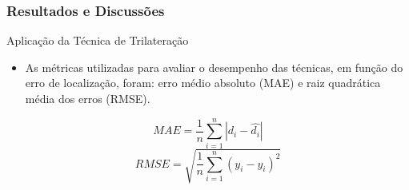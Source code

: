 \documentclass[xcolor={dvipsnames,svgnames,table}]{beamer}
\begin{document}
	\begin{frame}
		\frametitle{Resultados e Discussões}
		\begin{block}{Aplicação da Técnica de Trilateração}
			\begin{itemize}[label=\textcolor{black}{\textbullet}, left=5pt]
				\justifying
				\item As métricas utilizadas para avaliar o desempenho das técnicas, em função do erro de localização, foram: erro médio absoluto (MAE) e raiz quadrática média dos erros (RMSE).
				
			\end{itemize}
			\begin{equation}
				\label{equacao-mae}
				MAE = \frac{1}{n}\sum_{i=1}^{n} \left|d_i-\hat{d_i}\right|
			\end{equation}
			\begin{equation}
				\label{equacao-rmse}
				RMSE = \sqrt{\frac{1}{n}\sum_{i=1}^{n}\left(y_i-\hat{y_i}\right)^2}
			\end{equation}			
		\end{block}
		
	\end{frame}
	
\end{document}
